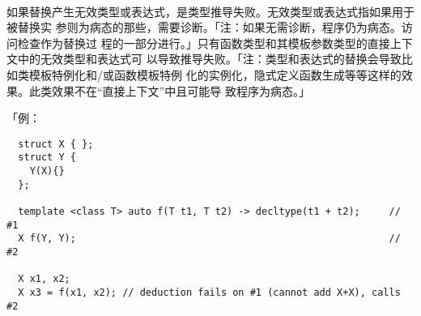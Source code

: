 \paragraph{}
如果替换产生无效类型或表达式，是类型推导失败。无效类型或表达式指如果用于被替换实
参则为病态的那些，需要诊断。「注：如果无需诊断，程序仍为病态。访问检查作为替换过
程的一部分进行。」只有函数类型和其模板参数类型的直接上下文中的无效类型和表达式可
以导致推导失败。「注：类型和表达式的替换会导致比如类模板特例化和/或函数模板特例
化的实例化，隐式定义函数生成等等这样的效果。此类效果不在``直接上下文''中且可能导
致程序为病态。」

「例：
\begin{lstlisting}
  struct X { };
  struct Y {
    Y(X){}
  };

  template <class T> auto f(T t1, T t2) -> decltype(t1 + t2);     // #1
  X f(Y, Y);                                                      // #2

  X x1, x2;
  X x3 = f(x1, x2); // deduction fails on #1 (cannot add X+X), calls #2
\end{lstlisting}

